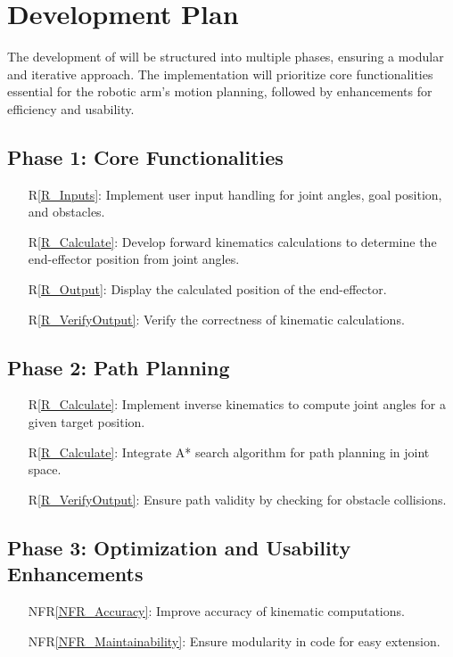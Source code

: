 \documentclass[12pt]{article}
\begin{document}
\section{Development Plan}

The development of \progname{} will be structured into multiple phases, ensuring a modular and iterative approach. The implementation will prioritize core functionalities essential for the robotic arm's motion planning, followed by enhancements for efficiency and usability.

\subsection{Phase 1: Core Functionalities}
\begin{itemize}
    \item[R\ref{R_Inputs}:] Implement user input handling for joint angles, goal position, and obstacles.
    \item[R\ref{R_Calculate}:] Develop forward kinematics calculations to determine the end-effector position from joint angles.
    \item[R\ref{R_Output}:] Display the calculated position of the end-effector.
    \item[R\ref{R_VerifyOutput}:] Verify the correctness of kinematic calculations.
\end{itemize}

\subsection{Phase 2: Path Planning}
\begin{itemize}
    \item[R\ref{R_Calculate}:] Implement inverse kinematics to compute joint angles for a given target position.
    \item[R\ref{R_Calculate}:] Integrate A* search algorithm for path planning in joint space.
    \item[R\ref{R_VerifyOutput}:] Ensure path validity by checking for obstacle collisions.
\end{itemize}

\subsection{Phase 3: Optimization and Usability Enhancements}
\begin{itemize}
    \item[NFR\ref{NFR_Accuracy}:] Improve accuracy of kinematic computations.
    \item[NFR\ref{NFR_Maintainability}:] Ensure modularity in code for easy extension.
\end{itemize}
\end{document}
